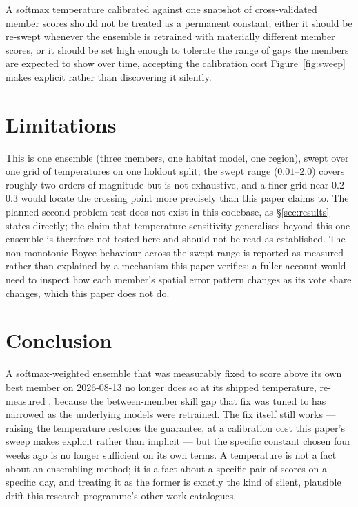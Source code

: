  A softmax temperature calibrated against
one snapshot of cross-validated member scores should not be treated as a
permanent constant; either it should be re-swept whenever the ensemble is
retrained with materially different member scores, or it should be set high
enough to tolerate the range of gaps the members are expected to show over
time, accepting the calibration cost Figure~\ref{fig:sweep} makes explicit
rather than discovering it silently.

\section{Limitations}
\label{sec:limitations}

This is one ensemble (three members, one habitat model, one region), swept
over one grid of temperatures on one holdout split; the swept range
(\(0.01\)--\(2.0\)) covers roughly two orders of magnitude but is not
exhaustive, and a finer grid near \(0.2\)--\(0.3\) would locate the
crossing point more precisely than this paper claims to. The planned
second-problem test does not exist in this codebase, as
\S\ref{sec:results} states directly; the claim that temperature-sensitivity
generalises beyond this one ensemble is therefore not tested here and
should not be read as established. The non-monotonic Boyce behaviour across
the swept range is reported as measured rather than explained by a
mechanism this paper verifies; a fuller account would need to inspect how
each member's spatial error pattern changes as its vote share changes,
which this paper does not do.

\section{Conclusion}

A softmax-weighted ensemble that was measurably fixed to score above its
own best member on 2026-08-13 no longer does so at its shipped temperature,
re-measured \AsOf{}, because the between-member skill gap that fix was
tuned to has narrowed as the underlying models were retrained. The fix
itself still works --- raising the temperature restores the guarantee, at a
calibration cost this paper's sweep makes explicit rather than implicit ---
but the specific constant chosen four weeks ago is no longer sufficient on
its own terms. A temperature is not a fact about an ensembling method; it
is a fact about a specific pair of scores on a specific day, and treating
it as the former is exactly the kind of silent, plausible drift this
research programme's other work catalogues.
